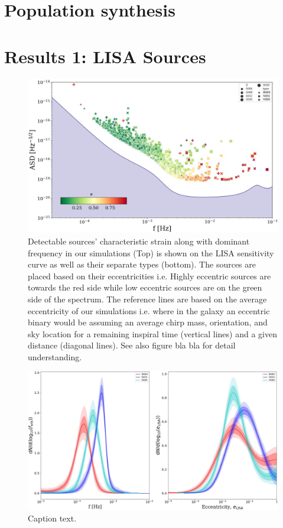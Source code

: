 \documentclass[journal, twocolumn]{IEEEtran}
\begin{document}
    \section{Population synthesis}
    \label{sec:population_synthesis}
    


    \section{Results 1: LISA Sources}
    \label{sec:r}
    \begin{subfigures}
        \begin{figure}[!t]
            \centering
            \includegraphics[width=0.82\linewidth]{images/first}
            \caption{\label{first}Detectable sources' characteristic strain along with dominant frequency in our simulations (Top) is shown on the LISA sensitivity curve as well as their separate types (bottom). The sources are placed based on their eccentricities i.e. Highly eccentric sources are towards the red side while low eccentric sources are on the green side of the spectrum. The reference lines are based on the average eccentricity of our simulations i.e. where in the galaxy an eccentric binary would be assuming an average chirp mass, orientation, and sky location for a remaining inspiral time (vertical lines) and a given distance (diagonal lines). See also figure bla bla for detail understanding.}\label{detect} %
        \end{figure}
        \begin{figure}
            \includegraphics[width=\linewidth]{images/second}
            \caption{Caption text.}\label{fig:freq} %
        \end{figure}
    \end{subfigures}
\end{document}
